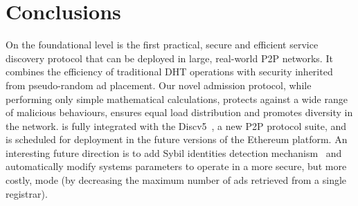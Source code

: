 
\section{Conclusions}
\label{sec:con}
On the foundational level \sysname is the first practical, secure and efficient service discovery protocol that can be deployed in large, real-world P2P networks. It combines the efficiency of traditional DHT operations with security inherited from pseudo-random ad placement. Our novel admission protocol, while performing only simple mathematical calculations, protects against a wide range of malicious behaviours, ensures equal load distribution and promotes diversity in the network.
\sysname is fully integrated with the Discv5~\cite{discv5}, a new P2P protocol suite, and is scheduled for deployment in the future versions of the Ethereum platform. 
An interesting future direction is to add Sybil identities detection mechanism~\cite{cholez2010efficient} and automatically modify systems parameters to operate in a more secure, but more costly, mode (\eg by decreasing the maximum number of ads retrieved from a single registrar). 

